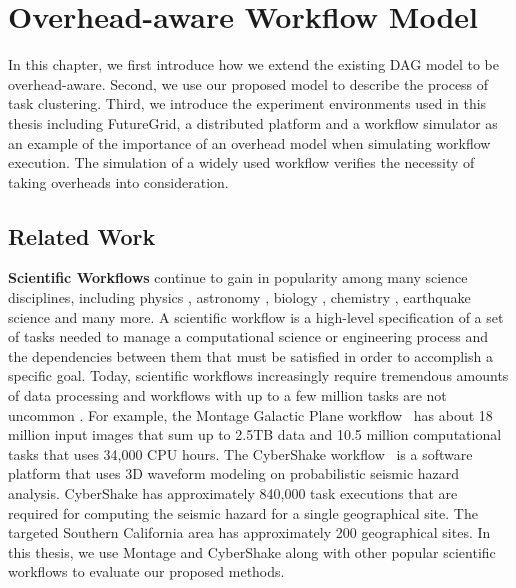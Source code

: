 \chapter{Overhead-aware Workflow Model}
\label{chap:model}

In this chapter, we first introduce how we extend the existing DAG model to be overhead-aware. Second, we use our proposed model to describe the process of task clustering. 
Third, we introduce the experiment environments used in this thesis including FutureGrid, a distributed platform and a workflow simulator as an example of the importance of an overhead model when simulating workflow execution. The simulation of a widely used workflow verifies the necessity of taking overheads into consideration.


\section{Related Work}
\label{sect:workflow_model}

\textbf{Scientific Workflows} continue to gain in popularity among many science disciplines, including physics \cite{Deelman2002}, astronomy \cite{Sakellariou2010}, biology \cite{Lathers2006, Oinn2004}, chemistry \cite{Wieczorek2005}, earthquake science \cite{Maechling2007} and many more. A scientific workflow is a high-level specification of a set of tasks needed to manage a computational science or engineering process and the dependencies between them that must be satisfied in order to accomplish a specific goal. Today, scientific workflows increasingly require tremendous amounts of data processing and workflows with up to a few million tasks are not uncommon \cite{Callaghan2011}. For example, the Montage Galactic Plane workflow~\cite{Berriman2004} has about 18 million input images that sum up to 2.5TB data and 10.5 million computational tasks that uses 34,000 CPU hours. The CyberShake workflow~\cite{Callaghan2008} is a software platform that uses 3D waveform modeling on probabilistic seismic hazard analysis. CyberShake has approximately 840,000 task executions that are required for computing the seismic hazard for a single geographical site. The targeted Southern California area has approximately 200 geographical sites. In this thesis, we use Montage and CyberShake along with other popular scientific workflows to evaluate our proposed methods. 

